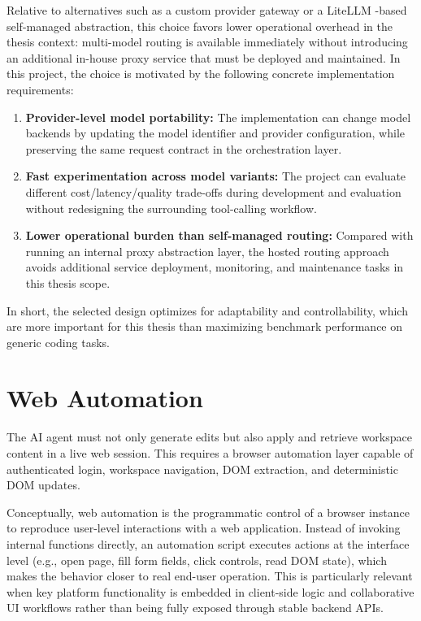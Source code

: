 Relative to alternatives such as a custom provider gateway or a LiteLLM \cite{litellmLiteLLM}-based self-managed abstraction, this choice favors lower operational overhead in the thesis context: multi-model routing is available immediately without introducing an additional in-house proxy service that must be deployed and maintained. In this project, the choice is motivated by the following concrete implementation requirements:
\begin{enumerate}
    \item \textbf{Provider-level model portability:} The implementation can change model backends by updating the model identifier and provider configuration, while preserving the same request contract in the orchestration layer.
    \item \textbf{Fast experimentation across model variants:} The project can evaluate different cost/latency/quality trade-offs during development and evaluation without redesigning the surrounding tool-calling workflow.
    \item \textbf{Lower operational burden than self-managed routing:} Compared with running an internal proxy abstraction layer, the hosted routing approach avoids additional service deployment, monitoring, and maintenance tasks in this thesis scope.
\end{enumerate}

In short, the selected design optimizes for adaptability and controllability, which are more important for this thesis than maximizing benchmark performance on generic coding tasks.

\section{Web Automation}
The AI agent must not only generate edits but also apply and retrieve workspace content in a live web session. This requires a browser automation layer capable of authenticated login, workspace navigation, DOM \cite{mozillaDocumentObject} extraction, and deterministic DOM updates.

Conceptually, web automation is the programmatic control of a browser instance to reproduce user-level interactions with a web application. Instead of invoking internal functions directly, an automation script executes actions at the interface level (e.g., open page, fill form fields, click controls, read DOM state), which makes the behavior closer to real end-user operation. This is particularly relevant when key platform functionality is embedded in client-side logic and collaborative UI workflows rather than being fully exposed through stable backend APIs.

